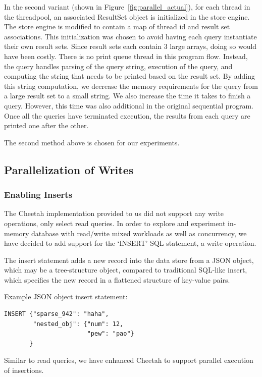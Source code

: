 \documentclass[11pt,journal,compsoc]{IEEEtran}
\begin{document}
In the second variant (shown in Figure~\ref{fig:parallel_actual}), for each thread in the threadpool, an associated ResultSet object is initialized in the store engine. The store engine is modified to contain a map of thread id and result set associations. This initialization was chosen to avoid having each query instantiate their own result sets. Since result sets each contain 3 large arrays, doing so would have been costly. There is no print queue thread in this program flow. Instead, the query handles parsing of the query string, execution of the query, and computing the string that needs to be printed based on the result set. By adding this string computation, we decrease the memory requirements for the query from a large result set to a small string. We also increase the time it takes to finish a query. However, this time was also additional in the original sequential program. Once all the queries have terminated execution, the results from each query are printed one after the other.

The second method above is chosen for our experiments.

\subsection{Parallelization of Writes}
\subsubsection{Enabling Inserts}


The Cheetah implementation provided to us did not support any write operations, only select read queries. In order to explore and experiment in-memory database with read/write mixed workloads as well as concurrency, we have decided to add support for the ‘INSERT’ SQL statement, a write operation.
 
The insert statement adds a new record into the data store from a JSON object, which may be a tree-structure object, compared to traditional SQL-like insert, which specifies the new record in a flattened structure of key-value pairs.

Example JSON object insert statement:

\begin{verbatim}
INSERT {"sparse_942": "haha",
        "nested_obj": {"num": 12, 
                       "pew": "pao"}
       }
\end{verbatim}

Similar to read queries, we have enhanced Cheetah to support parallel execution of insertions.
\end{document}
